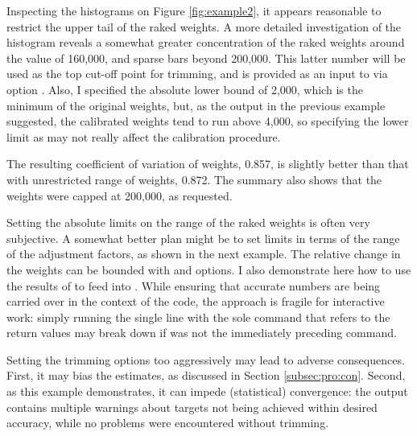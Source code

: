 \begin{stexample}[Example 3]

Inspecting the histograms on Figure \ref{fig:example2}, it appears reasonable
to restrict the upper tail of the raked weights. A more detailed investigation
of the histogram reveals a somewhat greater concentration of the raked weights
around the value of 160,000, and sparse bars beyond 200,000. This latter number
will be used as the top cut-off point for trimming, and is provided as an input
to  via option . Also, I specified the absolute
lower bound of 2,000, which is the minimum of the original weights, but,
as the output in the previous example suggested, the calibrated weights tend to run
above 4,000, so specifying the lower limit as  may not really
affect the calibration procedure.

\begin{stlog}
\nullskip
\end{stlog}

The resulting coefficient of variation of weights, 0.857, is slightly
better than that with unrestricted range of weights, 0.872. The summary also shows
that the weights were capped at 200,000, as requested.

Setting the absolute limits on the range of the raked weights is often
very subjective. A somewhat better plan might be to set limits in terms
of the range of the adjustment factors, as shown in the next example. The relative
change in the weights can be bounded with  and  
options.
I also demonstrate here how to use the results of  to feed
into . While ensuring that accurate numbers are being carried
over in the context of the code, the approach is fragile for interactive 
work: simply running the single line with the sole
 command that refers to the  return values
may break down if  was not the
immediately preceding command.

\begin{stlog}
\nullskip
\end{stlog}

\end{stexample}

Setting the trimming options too aggressively may lead to adverse
consequences. First, it may bias the estimates, as discussed in Section
\ref{subsec:pro:con}.
Second, as this example demonstrates, it can impede (statistical) convergence:
the output contains multiple warnings about targets not being achieved
within desired accuracy, while no problems were encountered without trimming.

